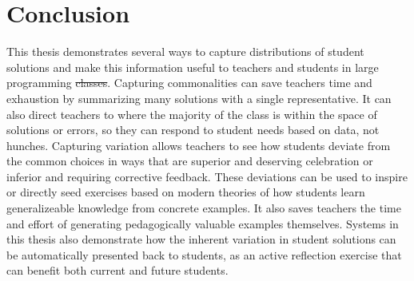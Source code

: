\documentclass[12pt,twoside]{mitthesis}
\providecommand{\DIFaddtex}[1]{{\protect\color{blue}\uwave{#1}}} %
\providecommand{\DIFdeltex}[1]{{\protect\color{red}\sout{#1}}}                      %
\providecommand{\DIFaddbegin}{} %
\providecommand{\DIFaddend}{} %
\providecommand{\DIFdelbegin}{} %
\providecommand{\DIFdelend}{} %
\providecommand{\DIFadd}[1]{\texorpdfstring{\DIFaddtex{#1}}{#1}} %
\providecommand{\DIFdel}[1]{\texorpdfstring{\DIFdeltex{#1}}{}} %
\begin{document}
{{{{{{{{{{%




\DIFdelend \chapter{Conclusion}\label{chapter:conclusion}

This thesis demonstrates several ways to capture distributions of student solutions and make this information useful to teachers and students in large programming \DIFdelbegin \DIFdel{classes}\DIFdelend \DIFaddbegin \DIFadd{courses}\DIFaddend . Capturing commonalities can save teachers time and exhaustion by summarizing many solutions with a single representative. It can also direct teachers to where the majority of the class is within the space of solutions or errors, so they can respond to student needs based on data, not hunches. Capturing variation allows teachers to see how students deviate from the common choices in ways that are superior and deserving celebration or inferior and requiring corrective feedback. These deviations can be used to inspire or directly seed exercises based on modern theories of how students learn generalizeable knowledge from concrete examples. It also saves teachers the time and effort of generating pedagogically valuable examples themselves. Systems in this thesis also demonstrate how the inherent variation in student solutions can be automatically presented back to students, as an active reflection exercise that can benefit both current and future students. 

}}}}}}}}}}
\end{document}
